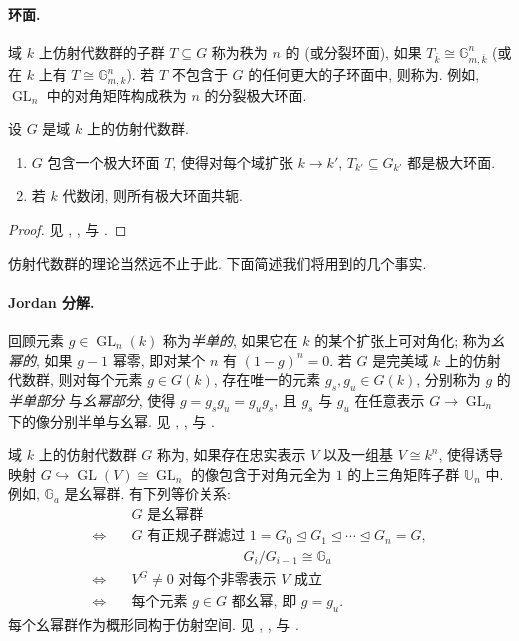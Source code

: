 \paragraph{环面.}
域 $k$ 上仿射代数群的子群 $T\subseteq G$ 称为秩为 $n$ 的 (或分裂环面), 如果 $T_{\overline k}\cong\mathbb G_{m,\overline k}^n$ (或在 $k$ 上有 $T\cong\mathbb G_{m,k}^n$). 若 $T$ 不包含于 $G$ 的任何更大的子环面中, 则称为. 例如, $\operatorname{GL}_n$ 中的对角矩阵构成秩为 $n$ 的分裂极大环面.
\begin{proposition}\label{src:B.1.22}
设 $G$ 是域 $k$ 上的仿射代数群.
\begin{enumerate}[(1)]
\item $G$ 包含一个极大环面 $T$, 使得对每个域扩张 $k\to k'$, $T_{k'}\subseteq G_{k'}$ 都是极大环面.
\item 若 $k$ 代数闭, 则所有极大环面共轭.
\end{enumerate}
\end{proposition}
\begin{proof}
见 \cite[\S III.$8$]{Bor91}, \cite[\S$34.3$--$5$]{Hum75}, \cite[定理 $13.3.6$]{Spr98} 与 \cite[定理 $17.82$, $17.105$]{Mil17}.
\end{proof}
仿射代数群的理论当然远不止于此. 下面简述我们将用到的几个事实.

\paragraph{Jordan 分解.}
回顾元素 $g\in\operatorname{GL}_n(k)$ 称为\textit{半单的}, 如果它在 $k$ 的某个扩张上可对角化; 称为\textit{幺幂的}, 如果 $g-1$ 幂零, 即对某个 $n$ 有 $(1-g)^n=0$. 若 $G$ 是完美域 $k$ 上的仿射代数群, 则对每个元素 $g\in G(k)$, 存在唯一的元素 $g_s,g_u\in G(k)$, 分别称为 $g$ 的\textit{半单部分} 与\textit{幺幂部分}, 使得 $g=g_sg_u=g_ug_s$, 且 $g_s$ 与 $g_u$ 在任意表示 $G\to\operatorname{GL}_n$ 下的像分别半单与幺幂. 见 \cite[\S$4$]{Bor91}, \cite[\S$15.3$]{Hum75}, \cite[\S$2.4$]{Spr98} 与 \cite[定理 $9.17$]{Mil17}.
\begin{example}[幺幂群]\label{src:B.1.23}
域 $k$ 上的仿射代数群 $G$ 称为, 如果存在忠实表示 $V$ 以及一组基 $V\cong k^n$, 使得诱导映射 $G\hookrightarrow\operatorname{GL}(V)\cong\operatorname{GL}_n$ 的像包含于对角元全为 $1$ 的上三角矩阵子群 $\mathbb U_n$ 中. 例如, $\mathbb G_a$ 是幺幂群. 有下列等价关系:
\[
\begin{aligned}
&G\text{ 是幺幂群}\\
\Longleftrightarrow\quad& G\text{ 有正规子群滤过 }1=G_0\trianglelefteq G_1\trianglelefteq\cdots\trianglelefteq G_n=G,\\
&\hspace{8em}G_i/G_{i-1}\cong\mathbb G_a\\
\Longleftrightarrow\quad& V^G\ne0\text{ 对每个非零表示 }V\text{ 成立}\\
\Longleftrightarrow\quad&\text{每个元素 }g\in G\text{ 都幺幂, 即 }g=g_u.
\end{aligned}
\]
每个幺幂群作为概形同构于仿射空间. 见 \cite[\S$4.8$]{Bor91}, \cite[\S$17.5$]{Hum75}, \cite[\S$2.4$]{Spr98} 与 \cite[\S$14$]{Mil17}.
\end{example}

